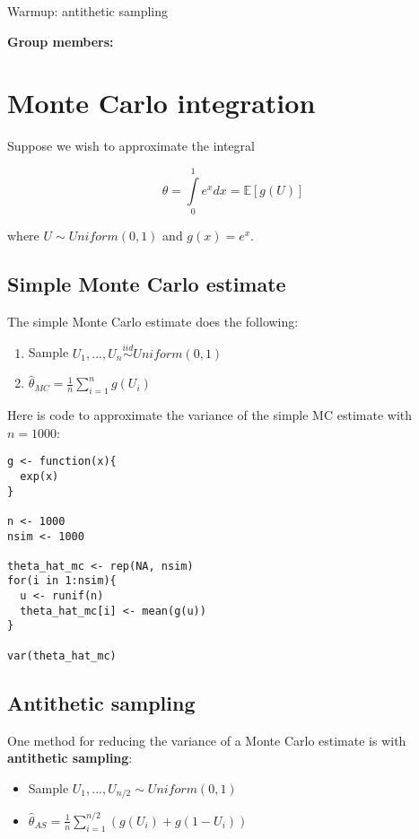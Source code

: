 \documentclass[12pt]{article}
\begin{document}
\begin{center}
\Large
Warmup: antithetic sampling \\
\normalsize
\vspace{5mm}
\end{center}

\noindent \textbf{Group members:}

\section*{Monte Carlo integration}

Suppose we wish to approximate the integral

$$\theta = \int \limits_0^1 e^x dx = \mathbb{E}[g(U)]$$

\noindent where $U \sim Uniform(0, 1)$ and $g(x) = e^x$.

\subsection*{Simple Monte Carlo estimate}

The simple Monte Carlo estimate does the following:

\begin{enumerate}
\item Sample $U_1,...,U_n \overset{iid}{\sim} Uniform(0, 1)$

\item $\widehat{\theta}_{MC} = \frac{1}{n} \sum \limits_{i=1}^n g(U_i)$
\end{enumerate}

\noindent Here is code to approximate the variance of the simple MC estimate with $n = 1000$:

\begin{verbatim}
g <- function(x){
  exp(x)
}

n <- 1000
nsim <- 1000

theta_hat_mc <- rep(NA, nsim)
for(i in 1:nsim){
  u <- runif(n)
  theta_hat_mc[i] <- mean(g(u))
}

var(theta_hat_mc)
\end{verbatim}

\subsection*{Antithetic sampling}

One method for reducing the variance of a Monte Carlo estimate is with \textbf{antithetic sampling}:

\begin{itemize}
\item Sample $U_1,...,U_{n/2} \sim Uniform(0, 1)$

\item $\widehat{\theta}_{AS} = \frac{1}{n} \sum \limits_{i=1}^{n/2} (g(U_i) + g(1 - U_i))$
\end{itemize}
\end{document}
